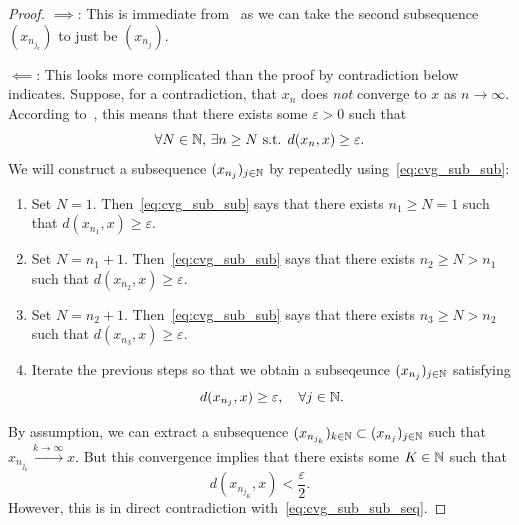 \begin{proof}
$\implies$: This is immediate from~ as we can take the second subsequence $(x_{n_{j_k}})$ to just be $(x_{n_j})$.

$\impliedby$: This looks more complicated than the proof by contradiction below indicates. Suppose, for a contradiction, that $x_n$ does \textit{not} converge to $x$ as $n\to \infty$. According to~, this means that there exists some $\varepsilon>0$ such that
\begin{equation}
	\label{eq:cvg_sub_sub}
	\forall N\in\mathbb{N},\,\exists n\ge N\text{ s.t. }d(x_n,x)\ge \varepsilon.
\end{equation}
We will construct a subsequence $(x_{n_j})_{j\in\mathbb{N}}$ by repeatedly using~\eqref{eq:cvg_sub_sub}:
\begin{enumerate}
	\item Set $N = 1$. Then~\eqref{eq:cvg_sub_sub} says that there exists $n_1\ge N = 1$ such that $d(x_{n_1},x)\ge \varepsilon$.
	\item Set $N = n_1+1$. Then~\eqref{eq:cvg_sub_sub} says that there exists $n_2\ge N>n_1$ such that $d(x_{n_2},x)\ge \varepsilon$.
	\item Set $N = n_2+1$. Then~\eqref{eq:cvg_sub_sub} says that there exists $n_3\ge N > n_2$ such that $d(x_{n_3},x)\ge \varepsilon$.
	\item Iterate the previous steps so that we obtain a subseqeunce $(x_{n_j})_{j\in\mathbb{N}}$ satisfying
	\begin{equation}
		\label{eq:cvg_sub_sub_seq}
	d(x_{n_j},x)\ge \varepsilon,\quad \forall j\in \mathbb{N}.
	\end{equation}
\end{enumerate}
By assumption, we can extract a subsequence $(x_{n_{j_k}})_{k\in\mathbb{N}}\subset (x_{n_j})_{j\in\mathbb{N}}$ such that $x_{n_{j_k}}\overset{k\to \infty}{\to}x$. But this convergence implies that there exists some $K\in\mathbb{N}$ such that
\[
d(x_{n_{j_K}},x)< \frac{\varepsilon}{2}.
\]
However, this is in direct contradiction with~\eqref{eq:cvg_sub_sub_seq}.
\end{proof}